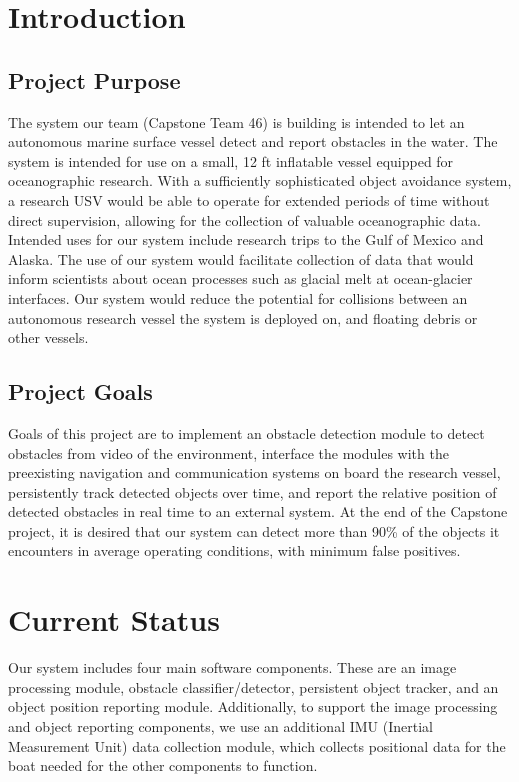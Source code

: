 \documentclass[onecolumn, draftclsnofoot,10pt, compsoc]{IEEEtran}
\begin{document}
\section{Introduction}

\subsection{Project Purpose}
The system our team (Capstone Team 46) is building is intended to let an autonomous marine surface vessel detect and report obstacles in the water. The system is  intended for use on a small, 12 ft inflatable vessel equipped for oceanographic research. With a sufficiently sophisticated object avoidance system, a research USV would be able to operate for extended periods of time without direct supervision, allowing for the collection of valuable oceanographic data. Intended uses for our system include research trips to the Gulf of Mexico and Alaska. The use of our system would facilitate collection of data that would inform scientists about ocean processes such as glacial melt at ocean-glacier interfaces. Our system would reduce the potential for collisions between an autonomous research vessel the system is deployed on, and floating debris or other vessels.



\subsection{Project Goals}
Goals of this project are to implement an obstacle detection module to detect obstacles from video of the environment, interface the modules with the preexisting navigation and communication systems on board the research vessel, persistently track detected objects over time, and report the relative position of detected obstacles in real time to an external system. At the end of the Capstone project, it is desired that our system can detect more than 90\% of the objects it encounters in average operating conditions, with minimum false positives.


\section{Current Status}
Our system includes four main software components. These are an image processing module, obstacle classifier/detector, persistent object tracker, and an object position reporting module. Additionally, to support the image processing and object reporting components, we use an additional IMU (Inertial Measurement Unit) data collection module, which collects positional data for the boat needed for the other components to function.
\end{document}
